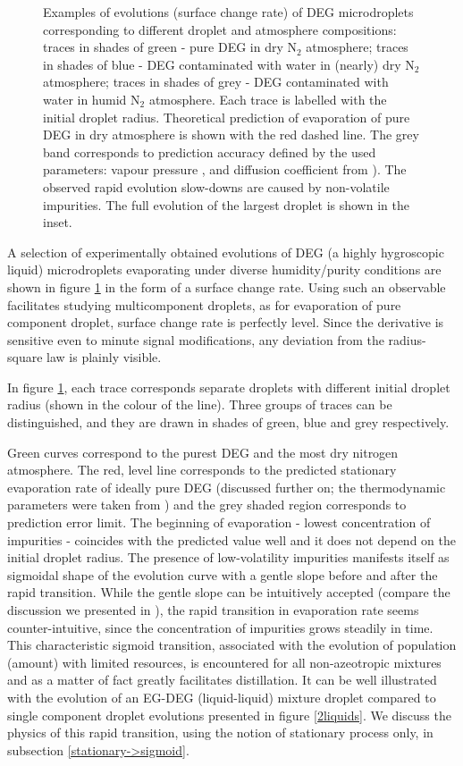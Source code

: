 \documentclass[twoside,twocolumn,9pt]{article}
\begin{document}
\begin{figure}[htb]
 \caption{Examples of evolutions (surface change rate) of DEG microdroplets corresponding to different droplet and atmosphere compositions: traces in shades of green - pure DEG in dry N$_2$ atmosphere; traces in shades of blue - DEG contaminated with water in (nearly) dry N$_2$ atmosphere; traces in shades of grey - DEG contaminated with water in humid N$_2$ atmosphere. Each trace is labelled with the initial droplet radius. Theoretical prediction of evaporation of pure DEG in dry atmosphere is shown with the red dashed line. The grey band corresponds to prediction accuracy defined by the used parameters: vapour pressure \cite{MEG}, and diffusion coefficient from \cite{Lugg}). The observed rapid evolution slow-downs are caused by non-volatile impurities. The full evolution of the largest droplet is shown in the inset.}
 \label{2aaprim}
\end{figure}

A selection of experimentally obtained evolutions of DEG (a highly hygroscopic liquid) microdroplets evaporating under diverse humidity/purity conditions are shown in figure \ref{2aaprim} in the form of a surface change rate. Using such an observable facilitates studying multicomponent droplets, as for evaporation of pure component droplet, surface change rate is perfectly level. Since the derivative is sensitive even to minute signal modifications, any deviation from the radius-square law is plainly visible.

In figure \ref{2aaprim}, each trace corresponds separate droplets with different initial droplet radius (shown in the colour of the line). Three groups of traces can be distinguished, and they are drawn in shades of green, blue and grey respectively.

Green curves correspond to the purest DEG and the most dry nitrogen atmosphere. The red, level line corresponds to the predicted stationary evaporation rate of ideally pure DEG (discussed further on; the thermodynamic parameters were taken from \cite{DEG, Lugg}) and the grey shaded region corresponds to prediction error limit. The beginning of evaporation - lowest concentration of  impurities - coincides with the predicted value well and it does not depend on the initial droplet radius. The presence of low-volatility impurities manifests itself as sigmoidal shape of the evolution curve with a gentle slope before and after the rapid transition. While the gentle slope can be intuitively accepted (compare the discussion we presented in \cite{Acta}), the rapid transition in evaporation rate seems counter-intuitive, since the concentration of impurities grows steadily in time. This characteristic sigmoid transition, associated with the evolution of population (amount) with limited resources, is encountered for all non-azeotropic mixtures and as a matter of fact greatly facilitates distillation. It can be well illustrated with the evolution of an EG-DEG (liquid-liquid) mixture droplet compared to single component droplet evolutions presented in figure \ref{2liquids}. We discuss the physics of this rapid transition, using the notion of stationary process only, in subsection \ref{stationary->sigmoid}.
\end{document}
